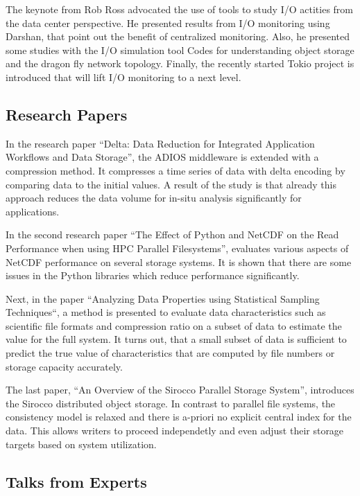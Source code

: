 \documentclass{llncs}
\begin{document}
The keynote from Rob Ross advocated the use of tools to study I/O actities from the data center perspective.
He presented results from I/O monitoring using Darshan, that point out the benefit of centralized monitoring.
Also, he presented some studies with the I/O simulation tool Codes for understanding object storage and the dragon fly network topology.
Finally, the recently started Tokio project is introduced that will lift I/O monitoring to a next level.

\subsection{Research Papers}

In the research paper “Delta: Data Reduction for Integrated Application Workflows and Data Storage”, the ADIOS middleware is extended with a compression method.
It compresses a time series of data with delta encoding by comparing data to the initial values.
A result of the study is that already this approach reduces the data volume for in-situ analysis significantly for applications.

In the second research paper “The Effect of Python and NetCDF on the Read Performance when using HPC Parallel Filesystems”, evaluates various aspects of NetCDF performance on several storage systems.
It is shown that there are some issues in the Python libraries which reduce performance significantly.

Next, in the paper “Analyzing Data Properties using Statistical Sampling Techniques“, a method is presented to evaluate data characteristics such as scientific file formats and compression ratio on a subset of data to estimate the value for the full system.
It turns out, that a small subset of data is sufficient to predict the true value of characteristics that are computed by file numbers or storage capacity accurately.

The last paper, “An Overview of the Sirocco Parallel Storage System”, introduces the Sirocco distributed object storage.
In contrast to parallel file systems, the consistency model is relaxed and there is a-priori no explicit central index for the data. This allows writers to proceed independetly and even adjust their storage targets based on system utilization.

\subsection{Talks from Experts}
\end{document}
